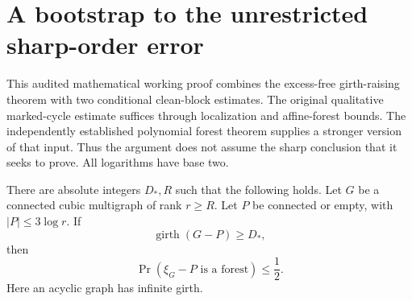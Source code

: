 \section{A bootstrap to the unrestricted sharp-order error}
\label{sec:unrestricted-sharp-bootstrap}

This audited mathematical working proof combines the excess-free girth-raising theorem with two conditional clean-block estimates.
The original qualitative marked-cycle estimate suffices through localization and affine-forest bounds.
The independently established polynomial forest theorem supplies a stronger version of that input.
Thus the argument does not assume the sharp conclusion that it seeks to prove.
All logarithms have base two.

\begin{theorem}
\label{thm:bootstrap-exact-half-forest}
There are absolute integers $D_*,R$ such that the following holds.
Let $G$ be a connected cubic multigraph of rank $r\ge R$.
Let $P$ be connected or empty, with $|P|\le3\log r$.
If
\[
 \operatorname{girth}(G-P)\ge D_*,
\]
then
\[
 \Pr(\xi_G-P\text{ is a forest})\le\frac12.
\]
Here an acyclic graph has infinite girth.
\end{theorem}

